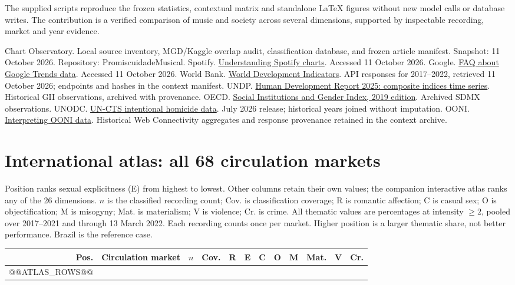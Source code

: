 \documentclass[10pt,a4paper,twocolumn]{article}
\begin{document}
The supplied scripts reproduce the frozen statistics, contextual matrix and standalone LaTeX figures without new model calls or database writes. The contribution is a verified comparison of music and society across several dimensions, supported by inspectable recording, market and year evidence.

\begingroup\scriptsize
\begin{thebibliography}{8}
\setlength{\itemsep}{1pt}\setlength{\parskip}{0pt}
 Chart Observatory. Local source inventory, MGD/Kaggle overlap audit, classification database, and frozen article manifest. Snapshot: 11 October 2026. Repository: PromiscuidadeMusical.
 Spotify. \href{https://support.spotify.com/us/artists/article/understanding-spotify-charts/}{Understanding Spotify charts}. Accessed 11 October 2026.
 Google. \href{https://support.google.com/trends/answer/4365533?hl=en}{FAQ about Google Trends data}. Accessed 11 October 2026.
 World Bank. \href{https://data.worldbank.org/}{World Development Indicators}. API responses for 2017--2022, retrieved 11 October 2026; endpoints and hashes in the context manifest.
 UNDP. \href{https://hdr.undp.org/data-center/documentation-and-downloads}{Human Development Report 2025: composite indices time series}. Historical GII observations, archived with provenance.
 OECD. \href{https://www.oecd.org/en/topics/sub-issues/social-institutions-and-gender-index.html}{Social Institutions and Gender Index, 2019 edition}. Archived SDMX observations.
 UNODC. \href{https://dataunodc.un.org/dp-intentional-homicide-victims}{UN-CTS intentional homicide data}. July 2026 release; historical years joined without imputation.
 OONI. \href{https://ooni.org/support/interpreting-ooni-data/}{Interpreting OONI data}. Historical Web Connectivity aggregates and response provenance retained in the context archive.
\end{thebibliography}
\endgroup
\clearpage
\onecolumn
\section*{International atlas: all 68 circulation markets}
\noindent\small Position ranks sexual explicitness (E) from highest to lowest. Other columns retain their own values; the companion interactive atlas ranks any of the 26 dimensions. $n$ is the classified recording count; Cov. is classification coverage; R is romantic affection; C is casual sex; O is objectification; M is misogyny; Mat. is materialism; V is violence; Cr. is crime. All thematic values are percentages at intensity $\geq2$, pooled over 2017--2021 and through 13 March 2022. Each recording counts once per market. Higher position is a larger thematic share, not better performance. Brazil is the reference case.\par\vspace{4pt}
\centering
\fontsize{8}{9}\selectfont\setlength{\tabcolsep}{4pt}
\begin{tabular}{@{}rlrrrrrrrrrr@{}}
\toprule Pos. & Circulation market & $n$ & Cov. & R & E & C & O & M & Mat. & V & Cr. \\
\midrule
@@ATLAS_ROWS@@
\bottomrule
\end{tabular}
\end{document}
